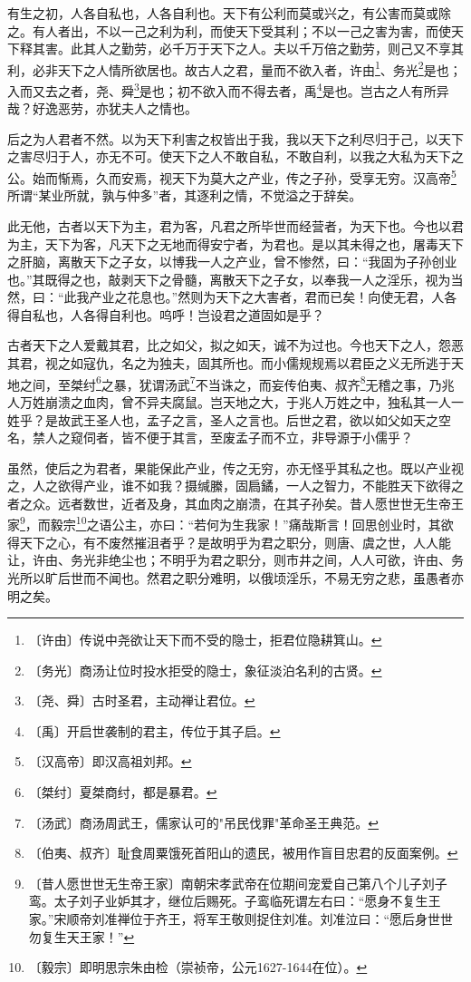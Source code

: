 \documentclass[12pt,UTF-8,openany]{ctexbook}
\begin{document}
\begin{normalsize}
    
    有生之初，人各自私也，人各自利也。天下有公利而莫或兴之，有公害而莫或除之。有人者出，不以一己之利为利，而使天下受其利；不以一己之害为害，而使天下释其害。此其人之勤劳，必千万于天下之人。夫以千万倍之勤劳，则己又不享其利，必非天下之人情所欲居也。故古人之君，量而不欲入者，许由\footnote{〔许由〕传说中尧欲让天下而不受的隐士，拒君位隐耕箕山。}、务光\footnote{〔务光〕商汤让位时投水拒受的隐士，象征淡泊名利的古贤。}是也；入而又去之者，尧、舜\footnote{〔尧、舜〕古时圣君，主动禅让君位。}是也；初不欲入而不得去者，禹\footnote{〔禹〕开启世袭制的君主，传位于其子启。}是也。岂古之人有所异哉？好逸恶劳，亦犹夫人之情也。
    
    后之为人君者不然。以为天下利害之权皆出于我，我以天下之利尽归于己，以天下之害尽归于人，亦无不可。使天下之人不敢自私，不敢自利，以我之大私为天下之公。始而惭焉，久而安焉，视天下为莫大之产业，传之子孙，受享无穷。汉高帝\footnote{〔汉高帝〕即汉高祖刘邦。}所谓“某业所就，孰与仲多”者，其逐利之情，不觉溢之于辞矣。
    
    此无他，古者以天下为主，君为客，凡君之所毕世而经营者，为天下也。今也以君为主，天下为客，凡天下之无地而得安宁者，为君也。是以其未得之也，屠毒天下之肝脑，离散天下之子女，以博我一人之产业，曾不惨然，曰：“我固为子孙创业也。”其既得之也，敲剥天下之骨髓，离散天下之子女，以奉我一人之淫乐，视为当然，曰：“此我产业之花息也。”然则为天下之大害者，君而已矣！向使无君，人各得自私也，人各得自利也。呜呼！岂设君之道固如是乎？
    
    古者天下之人爱戴其君，比之如父，拟之如天，诚不为过也。今也天下之人，怨恶其君，视之如寇仇，名之为独夫，固其所也。而小儒规规焉以君臣之义无所逃于天地之间，至桀纣\footnote{〔桀纣〕夏桀商纣，都是暴君。}之暴，犹谓汤武\footnote{〔汤武〕商汤周武王，儒家认可的"吊民伐罪"革命圣王典范。}不当诛之，而妄传伯夷、叔齐\footnote{〔伯夷、叔齐〕耻食周粟饿死首阳山的遗民，被用作盲目忠君的反面案例。}无稽之事，乃兆人万姓崩溃之血肉，曾不异夫腐鼠。岂天地之大，于兆人万姓之中，独私其一人一姓乎？是故武王圣人也，孟子之言，圣人之言也。后世之君，欲以如父如天之空名，禁人之窥伺者，皆不便于其言，至废孟子而不立，非导源于小儒乎？
    
    虽然，使后之为君者，果能保此产业，传之无穷，亦无怪乎其私之也。既以产业视之，人之欲得产业，谁不如我？摄缄縢，固扃鐍，一人之智力，不能胜天下欲得之者之众。远者数世，近者及身，其血肉之崩溃，在其子孙矣。昔人愿世世无生帝王家\footnote{〔昔人愿世世无生帝王家〕南朝宋孝武帝在位期间宠爱自己第八个儿子刘子鸾。太子刘子业妒其才，继位后赐死。子鸾临死谓左右曰：“愿身不复生王家。”宋顺帝刘准禅位于齐王，将军王敬则捉住刘准。刘准泣曰：“愿后身世世勿复生天王家！”}，而毅宗\footnote{〔毅宗〕即明思宗朱由检（崇祯帝，公元1627-1644在位）。}之语公主，亦曰：“若何为生我家！”痛哉斯言！回思创业时，其欲得天下之心，有不废然摧沮者乎？是故明乎为君之职分，则唐、虞之世，人人能让，许由、务光非绝尘也；不明乎为君之职分，则市井之间，人人可欲，许由、务光所以旷后世而不闻也。然君之职分难明，以俄顷淫乐，不易无穷之悲，虽愚者亦明之矣。
\end{normalsize}
\end{document}
